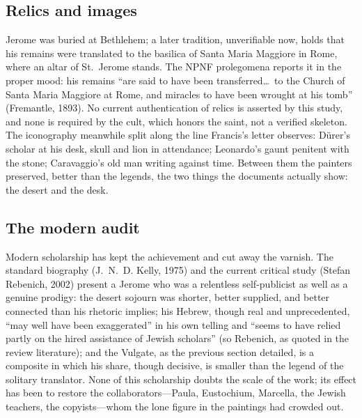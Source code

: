\subsection{Relics and images}

Jerome was buried at Bethlehem; a later tradition, unverifiable now, holds
that his remains were translated to the basilica of Santa Maria Maggiore in
Rome, where an altar of St.~Jerome stands. The NPNF prolegomena reports it
in the proper mood: his remains ``are said to have been transferred\ldots\
to the Church of Santa Maria Maggiore at Rome, and miracles to have been
wrought at his tomb'' (Fremantle, 1893). No current authentication of relics
is asserted by this study, and none is required by the cult, which honors
the saint, not a verified skeleton. The iconography meanwhile split along
the line Francis's letter observes: D\"urer's scholar at his desk, skull and
lion in attendance; Leonardo's gaunt penitent with the stone; Caravaggio's
old man writing against time. Between them the painters preserved, better
than the legends, the two things the documents actually show: the desert
and the desk.

\subsection{The modern audit}

Modern scholarship has kept the achievement and cut away the varnish. The
standard biography (J.~N.~D. Kelly, 1975) and the current critical study
(Stefan Rebenich, 2002) present a Jerome who was a relentless
self-publicist as well as a genuine prodigy: the desert sojourn was
shorter, better supplied, and better connected than his rhetoric implies;
his Hebrew, though real and unprecedented, ``may well have been
exaggerated'' in his own telling and ``seems to have relied partly on the
hired assistance of Jewish scholars'' (so Rebenich, as quoted in the review
literature); and the Vulgate, as the previous section detailed, is a
composite in which his share, though decisive, is smaller than the legend
of the solitary translator. None of this scholarship doubts the scale of
the work; its effect has been to restore the collaborators---Paula,
Eustochium, Marcella, the Jewish teachers, the copyists---whom the lone
figure in the paintings had crowded out.
